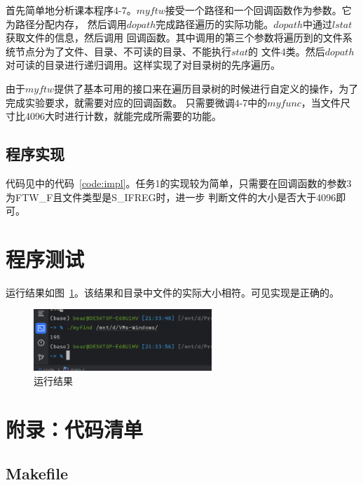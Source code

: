 \documentclass[a4paper,twoside]{article}
\begin{document}
\begin{spacing}{1.2}
\begin{figure}
\begin{tikzpicture}[node distance=1cm]
	\end{tikzpicture}
\end{figure}


首先简单地分析课本程序4-7。$myftw$接受一个路径和一个回调函数作为参数。它为路径分配内存，
然后调用$dopath$完成路径遍历的实际功能。$dopath$中通过$lstat$获取文件的信息，然后调用
回调函数。其中调用的第三个参数将遍历到的文件系统节点分为了文件、目录、不可读的目录、不能执行$stat$的
文件4类。然后$dopath$对可读的目录进行递归调用。这样实现了对目录树的先序遍历。

由于$myftw$提供了基本可用的接口来在遍历目录树的时候进行自定义的操作，为了完成实验要求，就需要对应的回调函数。
只需要微调4-7中的$myfunc$，当文件尺寸比4096大时进行计数，就能完成所需要的功能。


\subsection{程序实现}

代码见中的代码~\ref{code:impl}。任务1的实现较为简单，只需要在回调函数的参数3为FTW\_F且文件类型是S\_IFREG时，进一步
判断文件的大小是否大于4096即可。


\section{程序测试}

运行结果如图~\ref{fig:results}。该结果和目录中文件的实际大小相符。可见实现是正确的。

\begin{figure}[htb]
	\centering
	\caption{运行结果}
	\label{fig:results}
	\includegraphics[width=0.6\textwidth]{result.png}
\end{figure}


\appendix
\clearpage
\section*{附录：代码清单}
\label{sec:code}

\subsection{Makefile}


\end{spacing}
\end{document}
